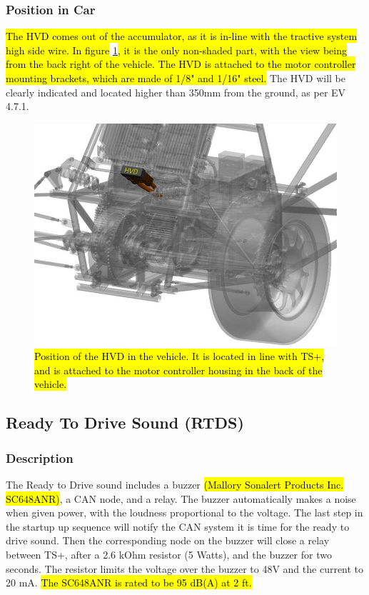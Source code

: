 \documentclass{article}
\DeclareRobustCommand{\hlr}[1]{{\sethlcolor{red}\hl{#1}}}
\begin{document}
        \subsubsection{Position in Car}

            \hlr{The HVD comes out of the accumulator, as it is in-line with the tractive system high side wire. In figure} \ref{hvdlocation}\hlr{, it is the only non-shaded part, with the view being from the back right of the vehicle. The HVD is attached to the motor controller mounting brackets, which are made of 1/8" and 1/16" steel.} The HVD will be clearly indicated and located higher than 350mm from the ground, as per EV 4.7.1.


        \begin{figure}[H]
            \centering
            \includegraphics[width = 0.6 \textwidth]{hvd_position}
            \caption{\hlr{Position of the HVD in the vehicle. It is located in line with TS+, and is attached to the motor controller housing in the back of the vehicle. }}
            \label{hvdlocation}
        \end{figure}

    \subsection{Ready To Drive Sound (RTDS)} \label{R2Dsection}

        \subsubsection{Description}

            The Ready to Drive sound includes a buzzer \hlr{(Mallory Sonalert Products Inc. SC648ANR)}, a CAN node, and a relay. The buzzer automatically makes a noise when given power, with the loudness proportional to the voltage. The last step in the startup up sequence will notify the CAN system it is time for the ready to drive sound. Then the corresponding node on the buzzer will close a relay between TS+, after a 2.6 kOhm resistor (5 Watts), and the buzzer for two seconds. The resistor limits the voltage over the buzzer to 48V and the current to 20 mA. \hlr{The SC648ANR is rated to be 95 dB(A) at 2 ft.}
\end{document}
